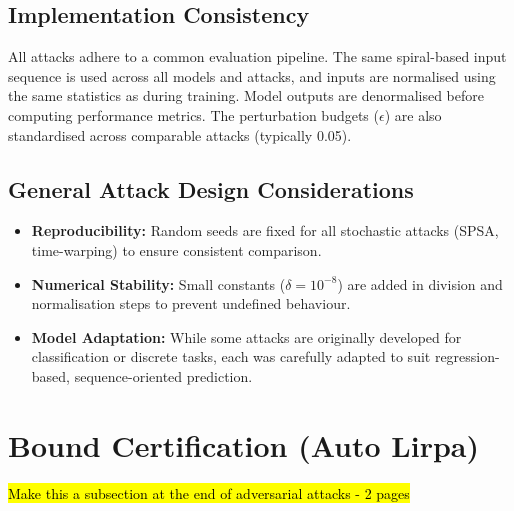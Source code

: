 \subsection*{Implementation Consistency}
All attacks adhere to a common evaluation pipeline.
The same spiral-based input sequence is used across all models and attacks, and inputs are normalised using the same statistics as during training. Model outputs are denormalised before computing performance metrics. The perturbation budgets ($\epsilon$) are also standardised across comparable attacks (typically 0.05).

\subsection*{General Attack Design Considerations}
\begin{itemize}
    \item \textbf{Reproducibility:} Random seeds are fixed for all stochastic attacks (SPSA, time-warping) to ensure consistent comparison.
    \item \textbf{Numerical Stability:} Small constants ($\delta = 10^{-8}$) are added in division and normalisation steps to prevent undefined behaviour.
    \item \textbf{Model Adaptation:} While some attacks are originally developed for classification or discrete tasks, each was carefully adapted to suit regression-based, sequence-oriented prediction.
\end{itemize}

\section{Bound Certification (Auto Lirpa)}

\hl{Make this a subsection at the end of adversarial attacks - 2 pages}